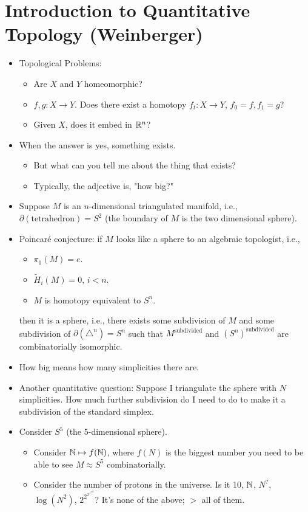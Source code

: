 \documentclass[../apprentice.tex]{subfiles}
\begin{document}
\section{Introduction to Quantitative Topology (Weinberger)}
\begin{itemize}
    \item {}Topological Problems:
    \begin{itemize}
        \item Are $X$ and $Y$ homeomorphic?
        \item $f,g:X\to Y$. Does there exist a homotopy $f_t:X\to Y$, $f_0=f,f_1=g$?
        \item Given $X$, does it embed in $\mathbb{R}^n$?
    \end{itemize}
    \item When the answer is yes, something exists.
    \begin{itemize}
        \item But what can you tell me about the thing that exists?
        \item Typically, the adjective is, "how big?"
    \end{itemize}
    \item Suppose $M$ is an $n$-dimensional triangulated manifold, i.e., $\partial(\text{tetrahedron})=S^2$ (the boundary of $M$ is the two dimensional sphere).
    \item Poincar\'{e} conjecture: if $M$ looks like a sphere to an algebraic topologist, i.e.,
    \begin{itemize}
        \item $\pi_1(M)=e$.
        \item $\tilde{H}_i(M)=0$, $i<n$.
        \item $M$ is homotopy equivalent to $S^n$.
    \end{itemize}
    then it is a sphere, i.e., there exists some subdivision of $M$ and some subdivision of $\partial(\triangle^n)=S^n$ such that $M^\text{subdivided}$ and $(S^n)^\text{subdivided}$ are combinatorially isomorphic.
    \item How big means how many simplicities there are.
    \item Another quantitative question: Suppose I triangulate the sphere with $N$ simplicities. How much further subdivision do I need to do to make it a subdivision of the standard simplex.
    \item Consider $S^5$ (the 5-dimensional sphere).
    \begin{itemize}
        \item Consider $\mathbb{N}\mapsto f(\mathbb{N})$, where $f(N)$ is the biggest number you need to be able to see $M\approx S^5$ combinatorially.
        \item Consider the number of protons in the universe. Is it 10, $\mathbb{N}$, $N^?$, $\log(N^2)$, $2^{2^{2^{\nearrow^N}}}$? It's none of the above; $>$ all of them.
    \end{itemize}
\end{itemize}
\end{document}
